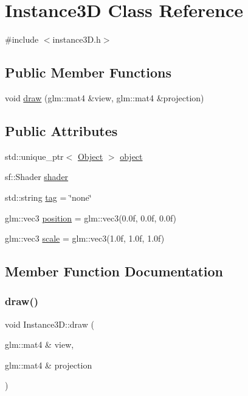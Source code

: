 \hypertarget{classInstance3D}{}\section{Instance3D Class Reference}
\label{classInstance3D}


{\ttfamily \#include $<$instance3\+D.\+h$>$}

\subsection*{Public Member Functions}
\begin{DoxyCompactItemize}
\item 
void \hyperlink{classInstance3D_a6ddedb1613f7dcc885b9b8a722ebd73b}{draw} (glm\+::mat4 \&view, glm\+::mat4 \&projection)
\end{DoxyCompactItemize}
\subsection*{Public Attributes}
\begin{DoxyCompactItemize}
\item 
std\+::unique\+\_\+ptr$<$ \hyperlink{classObject}{Object} $>$ \hyperlink{classInstance3D_af66fce2a9f2854259755505443683056}{object}
\item 
sf\+::\+Shader \hyperlink{classInstance3D_abad4211b399d2be03ffa2ea82ad50d5a}{shader}
\item 
std\+::string \hyperlink{classInstance3D_a93818416ceca4cf47a128fa08c329353}{tag} = \char`\"{}none\char`\"{}
\item 
glm\+::vec3 \hyperlink{classInstance3D_adf6e68d08e5a058e1a1b90e2a0eb435b}{position} = glm\+::vec3(0.\+0f, 0.\+0f, 0.\+0f)
\item 
glm\+::vec3 \hyperlink{classInstance3D_a08b79effaa2e84123c6f768c4a88ae27}{scale} = glm\+::vec3(1.\+0f, 1.\+0f, 1.\+0f)
\end{DoxyCompactItemize}


\subsection{Member Function Documentation}
\mbox{\label{classInstance3D_a6ddedb1613f7dcc885b9b8a722ebd73b}} 
\subsubsection{\texorpdfstring{draw()}{draw()}}
{\footnotesize\ttfamily void Instance3\+D\+::draw (\begin{DoxyParamCaption}\item[{glm\+::mat4 \&}]{view,  }\item[{glm\+::mat4 \&}]{projection }\end{DoxyParamCaption})\hspace{0.3cm}{\ttfamily [inline]}}



